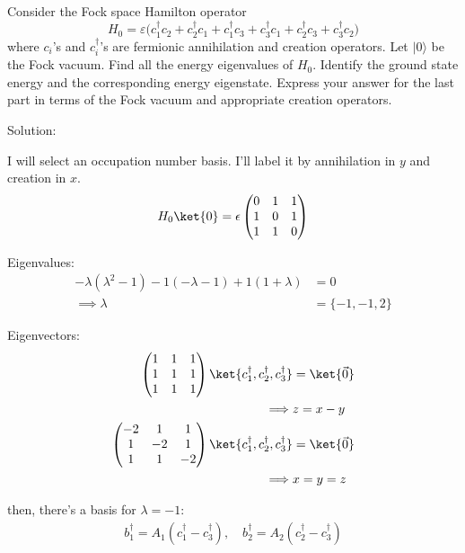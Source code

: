 \newpage \begin{homeworkProblem}
Consider the Fock space Hamilton operator
\[
H_0 = \varepsilon\Big(c_1^\dagger c_2 + c_2^\dagger c_1 + c_1^\dagger c_3 + c_3^\dagger c_1 + c_2^\dagger c_3 + c_3^\dagger c_2\Big)
\]
where $c_i$'s and $c_i^\dagger$'s are fermionic annihilation and creation operators. Let $|0\rangle$ be the Fock vacuum. Find all the energy eigenvalues of $H_0$. Identify the ground state energy and the corresponding energy eigenstate. Express your answer for the last part in terms of the Fock vacuum and appropriate creation operators.
\begin{callout}{Solution:}

    I will select an occupation number basis. I'll label it by annihilation in $y$ and creation in $x$. 
    \begin{align*}
        H_{0}\ket{0} = \epsilon \begin{pmatrix}  0 & 1 & 1 \\ 1 & 0 & 1 \\ 1 & 1 & 0 \end{pmatrix}
    \end{align*}

    Eigenvalues:
    \begin{align*}
        - \lambda (\lambda^{2} - 1) - 1(-\lambda - 1) + 1(1+\lambda) &= 0 \\ 
        \implies \lambda &= \{ -1, -1, 2 \}
    \end{align*}

    Eigenvectors:
    \begin{align*}
        \begin{pmatrix} 1&1&1\\1&1&1\\1&1&1 \end{pmatrix} \ket{c_{1}^{\dagger},c_{2}^{\dagger},c_{3}^{\dagger}}  &= \ket{\vec{0}}\\ 
                          \implies& z=x-y \\ 
                          \begin{pmatrix} -2&1&1\\1&-2&1\\1&1&-2 \end{pmatrix}\ket{c_{1}^{\dagger},c_{2}^{\dagger},c_{3}^{\dagger}} &= \ket{\vec{0}} \\ 
                          \implies& x=y=z
    \end{align*}

    then, there's a basis for $\lambda=-1$:
    \begin{align*}
    b_{1}^{\dagger} = A_{1}(c_1^{\dagger}-c_{3}^{\dagger}), \quad
    b_{2}^{\dagger} = A_{2}(c_{2}^{\dagger} - c_{3}^{\dagger})
    \end{align*}


\end{callout}
\end{homeworkProblem}

